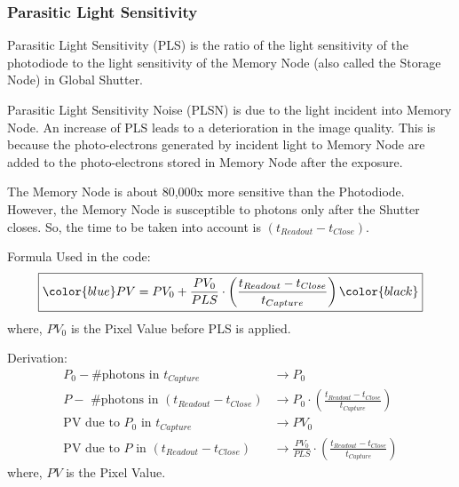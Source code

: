 
\subsubsection{Parasitic Light Sensitivity} %
Parasitic Light Sensitivity (PLS) is the ratio of the light sensitivity of the photodiode to the light sensitivity of the Memory Node (also called the Storage Node) in Global Shutter. \newline

Parasitic Light Sensitivity Noise (PLSN) is due to the light incident into Memory Node. An increase of PLS leads to a deterioration in the image quality.  This  is  because  the  photo-electrons  generated  by  incident  light  to  Memory Node  are  added  to  the  photo-electrons stored in Memory Node after the exposure. \newline

The Memory Node is about 80,000x more sensitive than the Photodiode. However, the Memory Node is susceptible to photons only after the Shutter closes. So, the time to be taken into account is $(t_{Readout} - t_{Close})$. \newline

Formula Used in the code:
\begin{equation}
    \begin{aligned}
        \boxed{ \color{blue} PV =  PV_0 + \frac{PV_0}{PLS} \cdot \left(\frac{t_{Readout} - t_{Close}}{t_{Capture}}\right) \color{black}} 
    \end{aligned}
\end{equation}
where, $PV_0$ is the Pixel Value before PLS is applied. 

Derivation:
\begin{equation*}
    \begin{aligned}
        P_0 - \text{\# photons in } t_{Capture} & \rightarrow P_0 \\
        P - \text{ \# photons in } (t_{Readout} - t_{Close}) & \rightarrow P_0 \cdot \left(\frac{t_{Readout} - t_{Close}}{t_{Capture}}\right) \\
        \text{PV due to } P_0 \text{ in } t_{Capture} & \rightarrow PV_0 \\
        \text{PV due to } P \text{ in } (t_{Readout} - t_{Close}) & \rightarrow \frac{PV_0}{PLS} \cdot \left(\frac{t_{Readout} - t_{Close}}{t_{Capture}}\right)
    \end{aligned}
\end{equation*}
where, $PV$ is the Pixel Value. 

